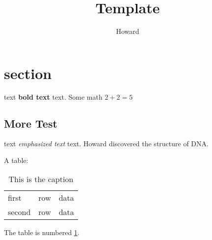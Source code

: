 \documentclass[12pt]{article}
\title{Template}
\author{Howard}
\begin{document}
\maketitle

\section{section}
text \textbf{bold text} text. Some math $2+2=5$
\subsection{More Test} %
text \emph{emphasized text} text.
Howard discovered the structure of DNA. 

A table: 
\begin{table}[!th]
\begin{tabular}{|l|c|r|}
\hline
first & row & data \\
second & row & data \\
\hline
\end{tabular}
\caption{This is the caption}
\label{1}
\end{table}

The table is numbered \ref{1}.
\end{document}
